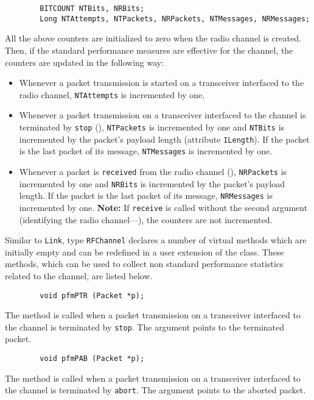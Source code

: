 \begin{verbatim}
        BITCOUNT NTBits, NRBits;
        Long NTAttempts, NTPackets, NRPackets, NTMessages, NRMessages;
\end{verbatim}

All the above counters are initialized to zero when the radio channel
is created.
Then, if the standard performance measures are effective for the channel, the
counters are updated in the following way:
\begin{itemize}
\item
Whenever a packet transmission is started on a transceiver interfaced to the
radio channel, {\tt NTAttempts} is incremented by one.
\item
Whenever a packet transmission on a transceiver interfaced to the channel
is terminated by {\tt stop} (),
{\tt NTPackets} is incremented by one and {\tt NTBits} is incremented by
the packet's payload length (attribute {\tt ILength}).
If the packet is the last packet of its message, {\tt NTMessages} is
incremented by one.
\item
Whenever a packet is {\tt received} from the radio channel (),
{\tt NRPackets} is incremented by one and {\tt NRBits} is incremented by
the packet's payload length.
If the packet is the last packet of its message, {\tt NRMessages} is
incremented by one.
{\bf Note:} If {\tt receive} is called without the second
argument (identifying the radio channel---),
the counters are not incremented.
\end{itemize}

Similar to {\tt Link}, type {\tt RFChannel} declares a number of virtual
methods which are initially
empty and can be redefined in a user extension of the class.
These methods, which can be used to collect non standard performance statistics
related to the channel, are listed below.

\begin{verbatim}
        void pfmPTR (Packet *p);
\end{verbatim}
The method is called when a packet transmission on a transceiver
interfaced to the channel is terminated by {\tt stop}.
The argument points to the terminated packet.

\begin{verbatim}
        void pfmPAB (Packet *p);
\end{verbatim}
The method is called when a packet transmission on a transceiver
interfaced to the channel is terminated by {\tt abort}.
The argument points to the aborted packet.

